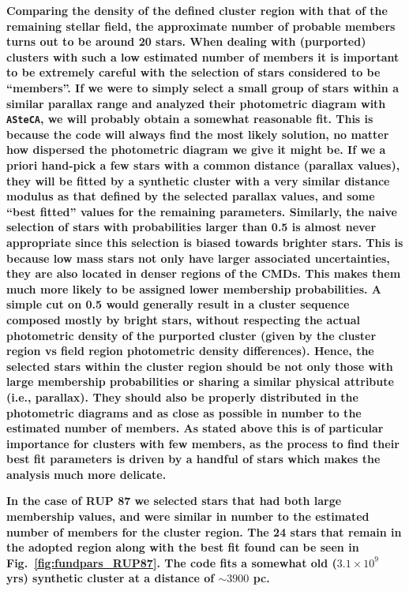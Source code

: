 \documentclass[referee]{aa}
\begin{document}
\textbf{Comparing the density of the defined cluster region with that of the
remaining stellar field, the approximate number of probable members turns out
to be around 20 stars.
%
When dealing with (purported) clusters with such a low estimated number of
members it is important to be extremely careful with the selection of stars
considered to be ``members''. If we were to simply select a small group
of stars within a similar parallax range and analyzed their photometric
diagram with \texttt{ASteCA}, we will probably obtain a somewhat reasonable
fit. This is because the code will always find the most likely solution,
no matter how dispersed the photometric diagram we give it might be. If we a
priori hand-pick a few stars with a common distance (parallax values), they
will be fitted by a synthetic cluster with a very similar distance modulus as
that defined by the selected parallax values, and some ``best fitted'' values
for the remaining parameters.
%
Similarly, the naive selection of stars with probabilities larger than 0.5 is
almost never appropriate since this selection is biased towards brighter stars.
This is because low mass stars not only have larger associated uncertainties,
they are also located in denser regions of the CMDs. This makes them much more
likely to be assigned lower membership probabilities. A simple cut on 0.5
would generally result in a cluster sequence composed mostly by bright stars,
without respecting the actual photometric density of the purported cluster 
(given by the cluster region vs field region photometric density differences).
%
Hence, the selected stars within the cluster region should be not only those
with large membership probabilities or sharing a similar physical attribute 
(i.e., parallax). They should also be properly distributed in the photometric
diagrams and as close as possible in number to the estimated number of members.
As stated above this is of particular importance for clusters with few members,
as the process to find their best fit parameters is driven by a handful of
stars which makes the analysis much more delicate.
}

\textbf{In the case of RUP 87 we selected stars that had both large membership
values, and were similar in number to the estimated number of members for the
cluster region. The 24 stars that remain in the adopted region along with the
best fit found can be seen in Fig.~\ref{fig:fundpars_RUP87}. The code fits a
somewhat old ($3.1\times10^9$ yrs) synthetic cluster at a distance of
$\sim3900$ pc.
}\\
\end{document}
